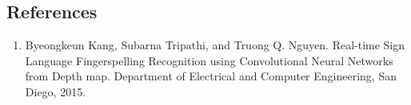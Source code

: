 \documentclass[a0,landscape]{a0poster}
\begin{document}
\begin{multicols}{4}
\section*{References}

\begin{enumerate}
\item Byeongkeun Kang, Subarna Tripathi, and Truong Q. Nguyen. Real-time Sign Language Fingerspelling Recognition using Convolutional Neural Networks from Depth map. Department of Electrical and Computer Engineering, San Diego, 2015.
\end{enumerate}




\end{multicols}
\end{document}

